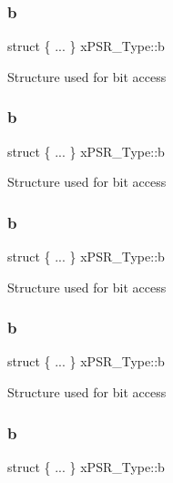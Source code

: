 \subsubsection{\texorpdfstring{b}{b}\hspace{0.1cm}{\footnotesize\ttfamily [3/12]}}
{\footnotesize\ttfamily struct \{ ... \}   x\+P\+S\+R\+\_\+\+Type\+::b}

Structure used for bit access \mbox{\label{unionx_p_s_r___type_a37909be48c1aeb4c53382e98e4a3fe4b}} 
\subsubsection{\texorpdfstring{b}{b}\hspace{0.1cm}{\footnotesize\ttfamily [4/12]}}
{\footnotesize\ttfamily struct \{ ... \}   x\+P\+S\+R\+\_\+\+Type\+::b}

Structure used for bit access \mbox{\label{unionx_p_s_r___type_a01f25dab5f11c78b2eff6b9ccf59e325}} 
\subsubsection{\texorpdfstring{b}{b}\hspace{0.1cm}{\footnotesize\ttfamily [5/12]}}
{\footnotesize\ttfamily struct \{ ... \}   x\+P\+S\+R\+\_\+\+Type\+::b}

Structure used for bit access \mbox{\label{unionx_p_s_r___type_aae3b3a834b3e9b13d5e7191d74d40eed}} 
\subsubsection{\texorpdfstring{b}{b}\hspace{0.1cm}{\footnotesize\ttfamily [6/12]}}
{\footnotesize\ttfamily struct \{ ... \}   x\+P\+S\+R\+\_\+\+Type\+::b}

Structure used for bit access \mbox{\label{unionx_p_s_r___type_a3b1063bb5cdad67e037cba993b693b70}} 
\subsubsection{\texorpdfstring{b}{b}\hspace{0.1cm}{\footnotesize\ttfamily [7/12]}}
{\footnotesize\ttfamily struct \{ ... \}   x\+P\+S\+R\+\_\+\+Type\+::b}

